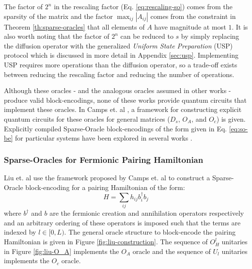 The factor of $2^n$ in the rescaling factor (Eq. \ref{eq:rescaling-so}) comes from the sparsity of the matrix and the factor $\max_{ij} {|A_{ij}|}$ comes from the constraint in Theorem \ref{th:sparse-oracles} that all elements of $A$ have magnitude at most $1$.
It is also worth noting that the factor of $2^n$ can be reduced to $s$ by simply replacing the diffusion operator with the generalized \textit{Uniform State Preparation} (USP) protocol which is discussed in more detail in Appendix \ref{sec:usp}.
Implementing USP requires more operations than the diffusion operator, so a trade-off exists between reducing the rescaling factor and reducing the number of operations.

Although these oracles - and the analogous oracles assumed in other works \cite{berry2009black, childs2009universal, berry2015hamiltonian, berry2015simulating,low2017optimal,childs2017quantum,gilyen2019quantum} - produce valid block-encodings, none of these works provide quantum circuits that implement these oracles.
In Camps et. al \cite{camps2024explicit}, a framework for constructing explicit quantum circuits for these oracles for general matrices ($D_s$, $O_A$, and $O_c$) is given.
Explicitly compiled Sparse-Oracle block-encodings of the form given in Eq. \ref{eq:so-be} for particular systems have been explored in several works \cite{camps2022fable, liu2024efficient, sanavio2024explicit} .


\subsubsection{Sparse-Oracles for Fermionic Pairing Hamiltonian}

Liu et. al \cite{liu2024efficient} use the framework proposed by Camps et. al \cite{camps2024explicit} to construct a Sparse-Oracle block-encoding for a pairing Hamiltonian of the form:
\begin{equation}
    \label{eq:pairing-ham}
    H = \sum_{ij}h_{ij}b^\dagger_i b_j
\end{equation}
where $b^\dagger$ and $b$ are the fermionic creation and annihilation operators respectively and an arbitrary ordering of these operators is imposed such that the terms are indexed by $l \in [0, L)$.
The general oracle structure to block-encode the pairing Hamiltonian is given in Figure \ref{fig:liu-construction}.
The sequence of $O_H^l$ unitaries in Figure \ref{fig:liu-O_A} implements the $O_A$ oracle and the sequence of $U_l$ unitaries implements the $O_c$ oracle.

